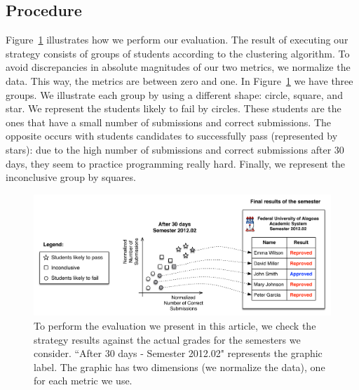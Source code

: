 



\subsection{Procedure}

\label{sec:procedure}

Figure~\ref{fig:procedure} illustrates how we perform our evaluation. The result of executing our strategy consists of groups of students according to the clustering algorithm. To avoid discrepancies in absolute magnitudes of our two metrics, we normalize the data. This way, the metrics are between zero and one. In Figure~\ref{fig:procedure} we have three groups. We illustrate each group by using a different shape: circle, square, and star. We represent the students likely to fail by circles. These students are the ones that have a small number of submissions and correct submissions. The opposite occurs with students candidates to successfully pass (represented by stars): due to the high number of submissions and correct submissions after 30 days, they seem to practice programming really hard. Finally, we represent the inconclusive group by squares.

\begin{figure}[htb]
\centering
\includegraphics[width=1.0\textwidth,natwidth=950,natheight=394]{images/Procedure.pdf}
\caption{To perform the evaluation we present in this article, we check the strategy results against the actual grades for the \semesters semesters we consider. ``After 30 days - Semester 2012.02" represents the graphic label. The graphic has two dimensions (we normalize the data), one for each metric we use.}
\label{fig:procedure}
\end{figure}

